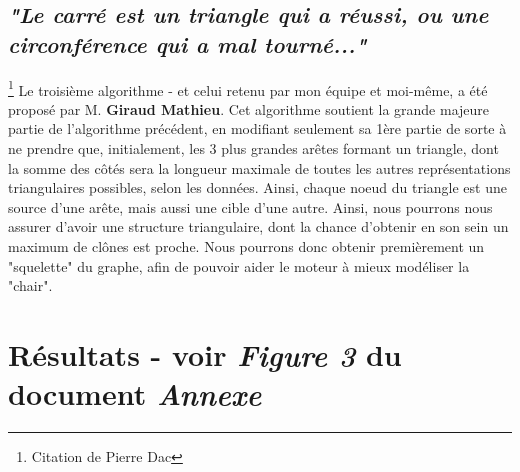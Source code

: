 \documentclass[12pt]{report}
\begin{document}
\begin{spacing}{1.2}
\subsection{\textit{"Le carré est un triangle qui a réussi, ou une circonférence qui a mal tourné..."}}\footnote{Citation de Pierre Dac}
Le troisième algorithme - et celui retenu par mon équipe et moi-même, a été proposé par M. \textbf{Giraud Mathieu}.
\newline
Cet algorithme soutient la grande majeure partie de l'algorithme précédent, en modifiant seulement sa 1ère partie de sorte à ne prendre que, initialement, les 3 plus grandes arêtes formant un triangle, dont la somme des côtés sera la longueur maximale de toutes les autres représentations triangulaires possibles, selon les données. Ainsi, chaque noeud du triangle est une source d'une arête, mais aussi une cible d'une autre.
\newline
Ainsi, nous pourrons nous assurer d'avoir une structure triangulaire, dont la chance d'obtenir en son sein un maximum de clônes est proche.
\newline
Nous pourrons donc obtenir premièrement un "squelette" du graphe, afin de pouvoir aider le moteur à mieux modéliser la "chair".

\section{Résultats  - voir \textit{Figure 3} du document \textit{Annexe}}


\end{spacing}
\end{document}

